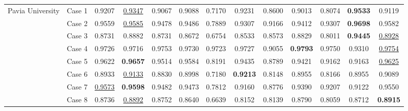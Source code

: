 \begin{table*}[t]
\begin{center}
{\begin{tabular}{cc ccccccccccc}
            	\multirow{8}{*}{Pavia University}
            	& Case 1 &
            	0.9207 & \underline{0.9347} & 0.9067 & 0.9088 & 0.7170 & 0.9231 & 0.8600 & 0.9013 & 0.8074 & \textbf{0.9533} & 0.9119 \\
            	& Case 2 & 
            	0.9559 & \underline{0.9585} & 0.9478 & 0.9486 & 0.7889 & 0.9307 & 0.9166 & 0.9412 & 0.9307 & \textbf{0.9698} & 0.9582 \\
                & Case 3 & 
                0.8731 & 0.8882 & 0.8731 & 0.8672 & 0.6754 & 0.8533 & 0.8573 & 0.8829 & 0.8011 & \textbf{0.9445} & \underline{0.8928} \\
                & Case 4 & 
                0.9726 & 0.9716 & 0.9753 & 0.9730 & 0.9723 & 0.9727 & 0.9055 & \textbf{0.9793} & 0.9750 & 0.9310 & \underline{0.9754} \\
                & Case 5 & 
                0.9622 & \textbf{0.9657} & 0.9514 & 0.9584 & 0.8191 & 0.9435 & 0.8789 & 0.9421 & 0.9162 & 0.9163 & \underline{0.9625} \\
                & Case 6 & 
                0.8933 & \underline{0.9133} & 0.8830 & 0.8998 & 0.7180 & \textbf{0.9213} & 0.8148 & 0.8955 & 0.8166 & 0.8955 & 0.9089 \\
                & Case 7 & 
                \underline{0.9573} & \textbf{0.9598} & 0.9482 & 0.9473 & 0.7812 & 0.9160 & 0.8776 & 0.9390 & 0.9207 & 0.9122 & 0.9550 \\
                & Case 8 & 
                0.8736 & \underline{0.8892} & 0.8752 & 0.8640 & 0.6639 & 0.8152 & 0.8139 & 0.8790 & 0.8059 & 0.8712 & \textbf{0.8915} \\
                
            \cmidrule(lr){1-13}
            

\end{tabular}}
\end{center}
\end{table*}
